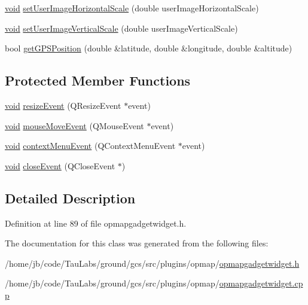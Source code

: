 \begin{DoxyCompactItemize}
\item 
\hyperlink{group___u_a_v_objects_plugin_ga444cf2ff3f0ecbe028adce838d373f5c}{void} \hyperlink{group___o_p_map_plugin_gab57277e52834ff73fe190391e3b2aa40}{set\-User\-Image\-Horizontal\-Scale} (double user\-Image\-Horizontal\-Scale)
\item 
\hyperlink{group___u_a_v_objects_plugin_ga444cf2ff3f0ecbe028adce838d373f5c}{void} \hyperlink{group___o_p_map_plugin_gab9a1ad0c6a406ed144ba3ec120d94d28}{set\-User\-Image\-Vertical\-Scale} (double user\-Image\-Vertical\-Scale)
\item 
bool \hyperlink{group___o_p_map_plugin_ga9d583efd0d407c4f509e812d454b41e0}{get\-G\-P\-S\-Position} (double \&latitude, double \&longitude, double \&altitude)
\end{DoxyCompactItemize}
\subsection*{\-Protected \-Member \-Functions}
\begin{DoxyCompactItemize}
\item 
\hyperlink{group___u_a_v_objects_plugin_ga444cf2ff3f0ecbe028adce838d373f5c}{void} \hyperlink{group___o_p_map_plugin_ga5364db038789e0e4ad94ae0606391100}{resize\-Event} (\-Q\-Resize\-Event $\ast$event)
\item 
\hyperlink{group___u_a_v_objects_plugin_ga444cf2ff3f0ecbe028adce838d373f5c}{void} \hyperlink{group___o_p_map_plugin_gac0a4e19ec058721095f125dfba28ea79}{mouse\-Move\-Event} (\-Q\-Mouse\-Event $\ast$event)
\item 
\hyperlink{group___u_a_v_objects_plugin_ga444cf2ff3f0ecbe028adce838d373f5c}{void} \hyperlink{group___o_p_map_plugin_gab4575b0db17580cc1a575aafa2fc5710}{context\-Menu\-Event} (\-Q\-Context\-Menu\-Event $\ast$event)
\item 
\hyperlink{group___u_a_v_objects_plugin_ga444cf2ff3f0ecbe028adce838d373f5c}{void} \hyperlink{group___o_p_map_plugin_ga07f947001ed1fdf9d099f170e5116aa2}{close\-Event} (\-Q\-Close\-Event $\ast$)
\end{DoxyCompactItemize}


\subsection{\-Detailed \-Description}


\-Definition at line 89 of file opmapgadgetwidget.\-h.



\-The documentation for this class was generated from the following files\-:\begin{DoxyCompactItemize}
\item 
/home/jb/code/\-Tau\-Labs/ground/gcs/src/plugins/opmap/\hyperlink{opmapgadgetwidget_8h}{opmapgadgetwidget.\-h}\item 
/home/jb/code/\-Tau\-Labs/ground/gcs/src/plugins/opmap/\hyperlink{opmapgadgetwidget_8cpp}{opmapgadgetwidget.\-cpp}\end{DoxyCompactItemize}
